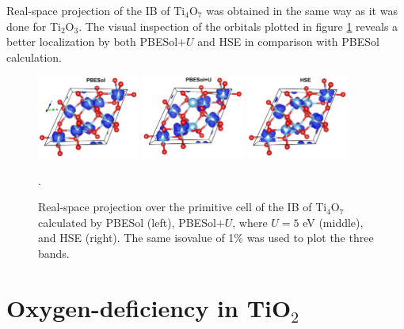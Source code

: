 Real-space projection of the IB of Ti$_4$O$_7$ was obtained in the same way as it was done for Ti$_2$O$_3$. The visual inspection of the orbitals plotted in figure \ref{fig:ti4o7-parchg} reveals a better localization by both PBESol$+U$ and HSE in comparison with PBESol calculation.
\begin{center}
  \begin{figure}[ht!]
      \begin{center}
        \includegraphics[width=0.3\textwidth]{img/ti4o7-parchg-pbsol+u0.jpg}
        \includegraphics[width=0.3\textwidth]{img/ti4o7-parchg-pbsol+u5.jpg}
        \includegraphics[width=0.3\textwidth]{img/ti4o7-parchg-hse.jpg}
      \end{center}
      \caption{Real-space projection over the primitive cell of the IB of Ti$_4$O$_7$ calculated by PBESol (left), PBESol$+U$, where $U = 5$ eV (middle), and HSE (right). The same isovalue of 1\% was used to plot the three bands.}.
      \label{fig:ti4o7-parchg} 
  \end{figure}
\end{center}

\section{Oxygen-deficiency in TiO$_2$}

